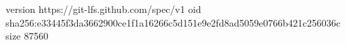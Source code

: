 version https://git-lfs.github.com/spec/v1
oid sha256:e33445f3da3662900ce1f1a16266c5d151e9e2fd8ad5059e0766b421c256036c
size 87560
